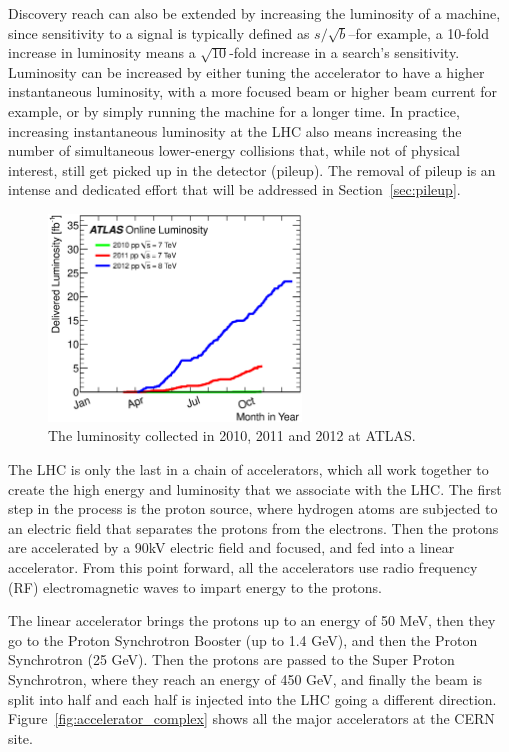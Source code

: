 Discovery reach can also be extended by increasing the luminosity of a machine, 
since sensitivity to a signal is typically defined as $s/\sqrt{b}$--for example, a 
10-fold increase in luminosity means a $\sqrt{10}$-fold increase in a search's sensitivity.  
Luminosity can be increased by either tuning the accelerator to have a higher instantaneous luminosity, with a more focused 
beam or higher beam current for example, or by simply running the machine for a longer time.  In 
practice, increasing instantaneous luminosity at the LHC also means increasing the number of simultaneous 
lower-energy collisions that, while not of physical interest, still get picked up in the detector (pileup).  
The removal of pileup is an intense and dedicated effort that will be addressed in Section~\ref{sec:pileup}.



\begin{figure}
	\centering
	\includegraphics[width=0.6\textwidth]{ATLASDetector/images/intlumivsyear.eps}
	\caption{The luminosity collected in 2010, 2011 and 2012 at ATLAS. \label{fig:lumi_vs_year}}
\end{figure}



The LHC is only the last in a chain of accelerators, which all work together to create the high 
energy and luminosity that we associate with the LHC.  The first step in the process is the proton source, 
where hydrogen atoms are subjected to an electric field that separates the protons from the electrons.  Then the 
protons are accelerated by a 90kV electric field and focused, and fed into a linear accelerator.  From this point 
forward, all the accelerators use radio frequency (RF) electromagnetic waves to impart energy to the protons.  

The linear accelerator brings the protons up to an energy of 50 MeV, then they go to the Proton 
Synchrotron Booster (up to 1.4 GeV), and then the Proton Synchrotron (25 GeV).  Then 
the protons are passed to the Super Proton Synchrotron, where they reach an energy of 450 GeV, and 
finally the beam is split into half and each half is injected into the LHC going a different direction.  
Figure~\ref{fig:accelerator_complex} shows all the major accelerators at the CERN site.



